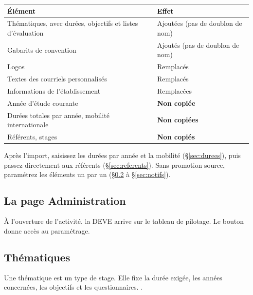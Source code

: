 \documentclass[11pt,a4paper]{article}
\begin{document}
\begin{center}
\begin{tabularx}{\linewidth}{@{}X l@{}}
\toprule
\textbf{Élément} & \textbf{Effet} \\
\midrule
Thématiques, avec durées, objectifs et listes d'évaluation & Ajoutées (pas de doublon de nom) \\
Gabarits de convention & Ajoutés (pas de doublon de nom) \\
Logos & Remplacés \\
Textes des courriels personnalisés & Remplacés \\
Informations de l'établissement & Remplacées \\
\midrule
Année d'étude courante & \textbf{Non copiée} \\
Durées totales par année, mobilité internationale & \textbf{Non copiées} \\
Référents, stages & \textbf{Non copiés} \\
\bottomrule
\end{tabularx}
\end{center}


Après l'import, saisissez les durées par année et la mobilité
(§\ref{sec:durees}), puis passez directement aux référents
(§\ref{sec:referents}). Sans promotion source, paramétrez les éléments un par un
(§\ref{sec:thematiques} à §\ref{sec:notifs}).

\subsection{La page Administration}

À l'ouverture de l'activité, la DEVE arrive sur le tableau de pilotage. Le bouton
 donne accès au paramétrage.


\subsection{Thématiques}
\label{sec:thematiques}

Une thématique est un type de stage. Elle fixe la durée exigée, les années
concernées, les objectifs et les questionnaires.
.

\end{document}
